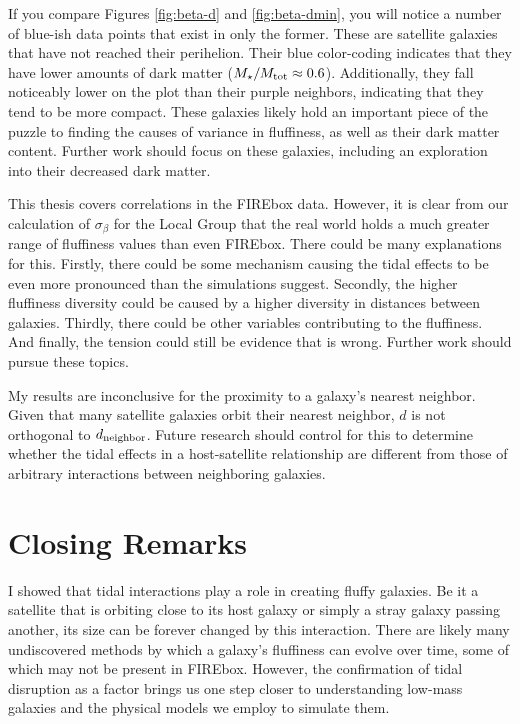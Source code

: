 If you compare Figures \ref{fig:beta-d} and \ref{fig:beta-dmin}, you will notice a number of blue-ish data points that exist in only the former. These are satellite galaxies that have not reached their perihelion. Their blue color-coding indicates that they have lower amounts of dark matter ($M_\star / M_{\rm{tot}} \approx 0.6$). Additionally, they fall noticeably lower on the plot than their purple neighbors, indicating that they tend to be more compact. These galaxies likely hold an important piece of the puzzle to finding the causes of variance in fluffiness, as well as their dark matter content. Further work should focus on these galaxies, including an exploration into their decreased dark matter.

This thesis covers correlations in the FIREbox data. However, it is clear from our calculation of $\sigma_\beta$ for the Local Group that the real world holds a much greater range of fluffiness values than even FIREbox. There could be many explanations for this. Firstly, there could be some mechanism causing the tidal effects to be even more pronounced than the simulations suggest. Secondly, the higher fluffiness diversity could be caused by a higher diversity in distances between galaxies. Thirdly, there could be other variables contributing to the fluffiness. And finally, the tension could still be evidence that \lcdm\* is wrong. Further work should pursue these topics.

My results are inconclusive for the proximity to a galaxy's nearest neighbor. Given that many satellite galaxies orbit their nearest neighbor, $d$ is not orthogonal to $d_{\rm{neighbor}}$. Future research should control for this to determine whether the tidal effects in a host-satellite relationship are different from those of arbitrary interactions between neighboring galaxies.

\section{Closing Remarks}

I showed that tidal interactions play a role in creating fluffy galaxies. Be it a satellite that is orbiting close to its host galaxy or simply a stray galaxy passing another, its size can be forever changed by this interaction. There are likely many undiscovered methods by which a galaxy's fluffiness can evolve over time, some of which may not be present in FIREbox. However, the confirmation of tidal disruption as a factor brings us one step closer to understanding low-mass galaxies and the physical models we employ to simulate them.